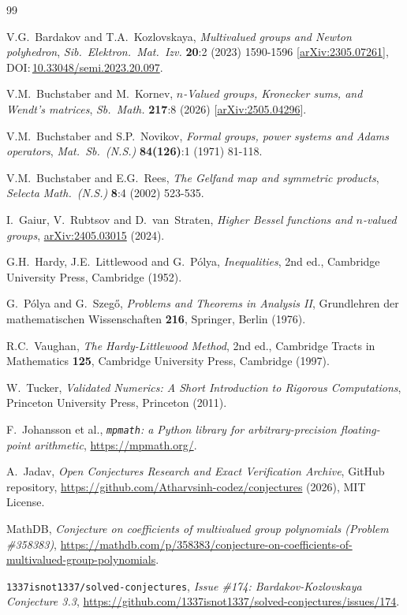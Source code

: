 \documentclass[10pt]{article}
\numberwithin{equation}{section}
\theoremstyle{plain}
\theoremstyle{definition}
\newcommand{\1}{\mathbf{1}}
\newcommand{\code}[1]{\texttt{#1}}
\begin{document}
\begin{thebibliography}{99}

V.G.~Bardakov and T.A.~Kozlovskaya, \emph{Multivalued groups and Newton polyhedron}, \emph{Sib.\ Elektron.\ Mat.\ Izv.} \textbf{20}:2 (2023) 1590-1596 [\href{https://arxiv.org/abs/2305.07261}{arXiv:2305.07261}], DOI:\,\href{https://doi.org/10.33048/semi.2023.20.097}{10.33048/semi.2023.20.097}.

V.M.~Buchstaber and M.~Kornev, \emph{$n$-Valued groups, Kronecker sums, and Wendt's matrices}, \emph{Sb.\ Math.} \textbf{217}:8 (2026) [\href{https://arxiv.org/abs/2505.04296}{arXiv:2505.04296}].

V.M.~Buchstaber and S.P.~Novikov, \emph{Formal groups, power systems and Adams operators}, \emph{Mat.\ Sb.\ (N.S.)} \textbf{84(126)}:1 (1971) 81-118.

V.M.~Buchstaber and E.G.~Rees, \emph{The Gelfand map and symmetric products}, \emph{Selecta Math.\ (N.S.)} \textbf{8}:4 (2002) 523-535.

I.~Gaiur, V.~Rubtsov and D.~van~Straten, \emph{Higher Bessel functions and $n$-valued groups}, \href{https://arxiv.org/abs/2405.03015}{arXiv:2405.03015} (2024).

G.H.~Hardy, J.E.~Littlewood and G.~P\'olya, \emph{Inequalities}, 2nd ed., Cambridge University Press, Cambridge (1952).

G.~P\'olya and G.~Szeg\H{o}, \emph{Problems and Theorems in Analysis II}, Grundlehren der mathematischen Wissenschaften \textbf{216}, Springer, Berlin (1976).

R.C.~Vaughan, \emph{The Hardy-Littlewood Method}, 2nd ed., Cambridge Tracts in Mathematics \textbf{125}, Cambridge University Press, Cambridge (1997).

W.~Tucker, \emph{Validated Numerics: A Short Introduction to Rigorous Computations}, Princeton University Press, Princeton (2011).

F.~Johansson et al., \emph{\code{mpmath}: a Python library for arbitrary-precision floating-point arithmetic}, \url{https://mpmath.org/}.

A.~Jadav, \emph{Open Conjectures Research and Exact Verification Archive}, GitHub repository, \url{https://github.com/Atharvsinh-codez/conjectures} (2026), MIT License.

MathDB, \emph{Conjecture on coefficients of multivalued group polynomials (Problem \#358383)}, \url{https://mathdb.com/p/358383/conjecture-on-coefficients-of-multivalued-group-polynomials}.

\code{1337isnot1337/solved-conjectures}, \emph{Issue \#174: Bardakov-Kozlovskaya Conjecture 3.3}, \url{https://github.com/1337isnot1337/solved-conjectures/issues/174}.

\end{thebibliography}
\end{document}
